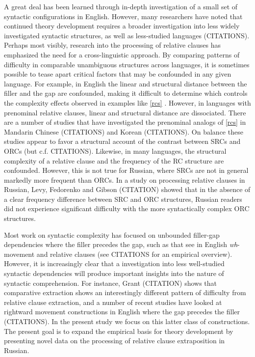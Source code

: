 \documentclass[12pt]{article}
\begin{document}
	 A great deal has been learned through in-depth investigation of a small set of syntactic configurations in English. However, many researchers have noted that continued theory development requires a broader investigation into less widely investigated syntactic structures, as well as less-studied languages (CITATIONS). Perhaps most visibly, research into the processing of relative clauses has emphasized the need for a cross-linguistic approach. By comparing patterns of difficulty in comparable unambiguous structures across languages, it is sometimes possible to tease apart critical factors that may be confounded in any given language. For example, in English the linear and structural distance between the filler and the gap are confounded, making it difficult to determine which controls the complexity effects observed in examples like \ref{rcs} . However, in languages with prenominal relative clauses, linear and structural distance are dissociated. There are a number of studies that have investigated the prenominal analogs of \ref{rcs} in Mandarin Chinese (CITATIONS) and Korean (CITATIONS). On balance these studies appear to favor a structural account of the contrast between SRCs and ORCs (but c.f. CITATIONS). Likewise, in many languages, the structural complexity of a relative clause and the frequency of the RC structure are confounded. However, this is not true for Russian, where SRCs are not in general markedly more frequent than ORCs. In a study on processing relative clauses in Russian, Levy, Fedorenko and Gibson (CITATION) showed that in the absence of a clear frequency difference between SRC and ORC structures, Russian readers did not experience significant difficulty with the more syntactically complex ORC structures. 
	 
	Most work on syntactic complexity has focused on unbounded filler-gap dependencies where the filler precedes the gap, such as that see in English \textit{wh}-movement and relative clauses (see CITATIONS for an empirical overview). However, it is increasingly clear that a investigation into less well-studied syntactic dependencies will produce important insights into the nature of syntactic comprehension. For instance, Grant (CITATION) shows that comparative extraction shows an interestingly different pattern of difficulty from relative clause extraction, and a number of recent studies have looked at rightward movement constructions in English where the gap precedes the filler (CITATIONS).  In the present study we focus on this latter class of constructions. The present goal is to expand the empirical basis for theory development by presenting novel data on the processing of relative clause extraposition in Russian. 
	
\end{document}
